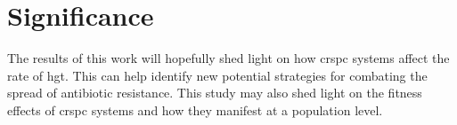 \section*{\huge Significance}
The results of this work will hopefully shed light on how \ac{crspc} systems affect the rate of \ac{hgt}.
This can help identify new potential strategies for combating the spread of antibiotic resistance.
This study may also shed light on the fitness effects of \ac{crspc} systems and how they manifest at a population level.\par

